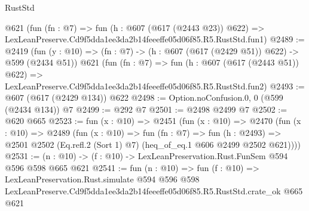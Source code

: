 \begin{lexlean}{RustStd}
\begin{coremodule}
    @621
    (fun (fn : @7) =>
    fun (h : @607 (@617 (@2443 @23)) @622) =>
    LexLeanPreserve.Cd9f5dda1ee3da2b14feeeffe05d06f85.R5.RustStd.fun1)
@2489 := @2419
    (fun (y : @10) => (fn : @7) -> (h : @607 (@617 (@2429 @51)) @622) -> @599 (@2434 @51))
    @621
    (fun (fn : @7) =>
    fun (h : @607 (@617 (@2443 @51)) @622) =>
    LexLeanPreserve.Cd9f5dda1ee3da2b14feeeffe05d06f85.R5.RustStd.fun2)
@2493 := @607 (@617 (@2429 @134)) @622
@2498 := Option.noConfusion.{0, 0} (@599 (@2434 @134)) @7
@2499 := @292 @7
@2501 := @2498 @2499 @7
@2502 := @620 @665
@2523 := fun (x : @10) =>
  @2451
    (fun (x : @10) =>
    @2470
      (fun (x : @10) =>
      @2489
        (fun (x : @10) =>
        fun (fn : @7) =>
        fun (h : @2493) =>
        @2501 @2502 (Eq.refl.{2} (Sort 1) @7) (heq_of_eq.{1} @606 @2499 @2502 @621))))
@2531 := (n : @10) -> (f : @10) -> LexLeanPreservation.Rust.FunSem @594 @596 @598 @665 @621
@2541 := fun (n : @10) =>
  fun (f : @10) =>
  LexLeanPreservation.Rust.simulate
    @594
    @596
    @598
    LexLeanPreserve.Cd9f5dda1ee3da2b14feeeffe05d06f85.R5.RustStd.crate_ok
    @665
    @621
\end{coremodule}
\end{lexlean}

